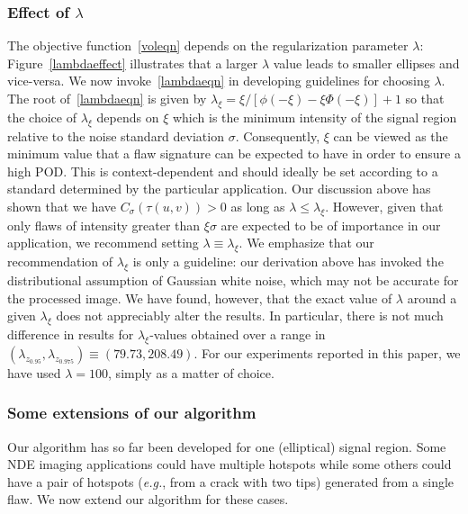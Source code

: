 \documentclass[12pt]{article}
\begin{document}
\subsubsection{Effect of $\lambda$}
The objective function~\eqref{voleqn} depends on the regularization
parameter $\lambda$: Figure~\ref{lambdaeffect} illustrates that a
larger $\lambda$ value leads to smaller ellipses and vice-versa. We now
invoke~\eqref{lambdaeqn} in developing guidelines for choosing 
$\lambda$. 
The root of~\eqref{lambdaeqn} is given by
$
\lambda_\xi = \xi/[\phi(-\xi) - \xi\Phi(-\xi)]+1
$
so that the choice of $\lambda_\xi$ depends on $\xi$
which is the minimum
intensity  of the signal region relative to the noise standard
deviation $\sigma$. Consequently, $\xi$ can be viewed as the minimum
value that a flaw signature can be expected to have in order to ensure
a high POD. This is context-dependent and should ideally
be  set according to a standard determined by the 
particular application. Our discussion above has shown that  we have
$C_\sigma(\tau(u,v)) > 0$ as long as
$\lambda\leq\lambda_\xi$. However, given that only flaws of intensity
greater than $\xi\sigma$ are expected to be of importance in our application, we
recommend setting $\lambda\equiv\lambda_\xi$. We emphasize that our
recommendation of $\lambda_\xi$ is only a guideline: our derivation
above has invoked 
the distributional assumption of Gaussian white noise, which may not
be accurate  for the processed image. We have found, however, that
the exact value of $\lambda$ around a given $\lambda_\xi$ does not
appreciably alter the results. In particular, there is not much
difference in results for $\lambda_\xi$-values obtained over a range
in $(\lambda_{z_{0.95}},  \lambda_{z_{0.975}})\equiv
(79.73, 208.49)$. For our experiments 
reported in this paper, we  have used $\lambda = 100$, simply as a
matter of choice. 
\subsubsection{Some extensions of our algorithm}
\label{extensions}
Our algorithm has so far been developed for one (elliptical)
signal region. Some NDE imaging applications could have
multiple hotspots while some others could have a pair
of hotspots ({\em e.g.}, from a crack with two tips) generated from a
single flaw. We now extend our algorithm for these  cases.
\end{document}
